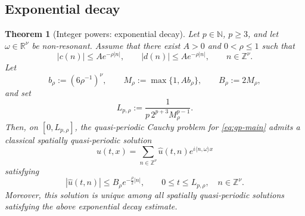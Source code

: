 \documentclass[12pt,reqno,tbtags]{amsart}
\newtheorem{theorem}{Theorem}[section]
\newcommand\1{\mathbbm{1}}
\begin{document}
\subsection{Exponential decay}

\begin{theorem}[Integer powers: exponential decay]\label{thm:gp-exp}
Let $p\in\mathbb N$, $p\ge3$, and let $\omega\in\mathbb R^\nu$ be non-resonant.
Assume that there exist $A>0$ and $0<\rho\le1$ such that
\[
|c(n)|\le A e^{-\rho|n|},
\qquad
|d(n)|\le A e^{-\rho|n|},
\qquad n\in\mathbb Z^\nu .
\]
Let
\[
b_\rho:=(6\rho^{-1})^\nu,
\qquad
M_\rho:=\max\{1,Ab_\rho\},
\qquad
B_\rho:=2M_\rho,
\]
and set
\[
L_{p,\rho}:=
\frac{1}{p\,2^{p+3}M_\rho^{p-1}} .
\]
Then, on $[0,L_{p,\rho}]$, the quasi-periodic Cauchy problem for
\eqref{eq:gp-main} admits a classical spatially quasi-periodic solution
\[
u(t,x)=\sum_{n\in\mathbb Z^\nu}\widehat u(t,n)e^{i\langle n,\omega\rangle x}
\]
satisfying
\[
|\widehat u(t,n)|
\le
B_\rho e^{-\frac{\rho}{2}|n|},
\qquad
0\le t\le L_{p,\rho},\quad n\in\mathbb Z^\nu .
\]
Moreover, this solution is unique among all spatially quasi-periodic solutions
satisfying the above exponential decay estimate.
\end{theorem}
\end{document}
